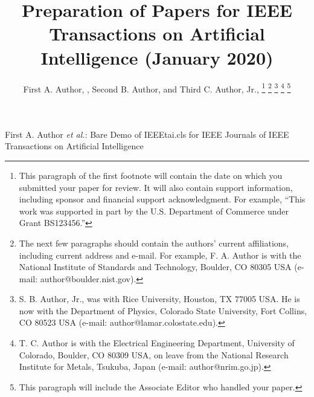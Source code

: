 \documentclass[journal]{IEEEtai}
\begin{document}
\title{Preparation of Papers for IEEE {\sc Transactions on Artificial Intelligence} (January 2020)} 


\author{First A. Author, , Second B. Author, and Third C. Author, Jr., 
\thanks{This paragraph of the first footnote will contain the date on which you submitted your paper for review. It will also contain support information, including sponsor and financial support acknowledgment. For example, ``This work was supported in part by the U.S. Department of Commerce under Grant BS123456.'' }
\thanks{The next few paragraphs should contain the authors' current affiliations, including current address and e-mail. For example, F. A. Author is with the National Institute of Standards and Technology, Boulder, CO 80305 USA (e-mail: author@boulder.nist.gov).}
\thanks{S. B. Author, Jr., was with Rice University, Houston, TX 77005 USA. He is now with the Department of Physics, Colorado State University, Fort Collins, CO 80523 USA (e-mail: author@lamar.colostate.edu).}
\thanks{T. C. Author is with the Electrical Engineering Department, University of Colorado, Boulder, CO 80309 USA, on leave from the National Research Institute for Metals, Tsukuba, Japan (e-mail: author@nrim.go.jp).}
\thanks{This paragraph will include the Associate Editor who handled your paper.}}

{First A. Author \MakeLowercase{\textit{et al.}}: Bare Demo of IEEEtai.cls for IEEE Journals of IEEE Transactions on Artificial Intelligence}

\maketitle
\end{document}
